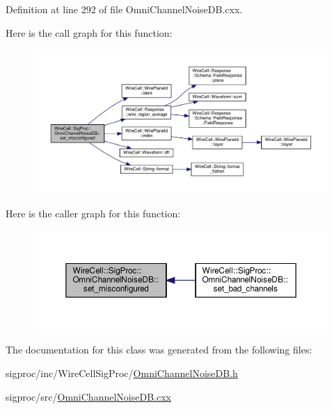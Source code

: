 Definition at line 292 of file Omni\+Channel\+Noise\+D\+B.\+cxx.

Here is the call graph for this function\+:
\nopagebreak
\begin{figure}[H]
\begin{center}
\leavevmode
\includegraphics[width=350pt]{class_wire_cell_1_1_sig_proc_1_1_omni_channel_noise_d_b_a7a1a60aef8d2935c36e27a735117a1cb_cgraph}
\end{center}
\end{figure}
Here is the caller graph for this function\+:
\nopagebreak
\begin{figure}[H]
\begin{center}
\leavevmode
\includegraphics[width=350pt]{class_wire_cell_1_1_sig_proc_1_1_omni_channel_noise_d_b_a7a1a60aef8d2935c36e27a735117a1cb_icgraph}
\end{center}
\end{figure}


The documentation for this class was generated from the following files\+:\begin{DoxyCompactItemize}
\item 
sigproc/inc/\+Wire\+Cell\+Sig\+Proc/\hyperlink{_omni_channel_noise_d_b_8h}{Omni\+Channel\+Noise\+D\+B.\+h}\item 
sigproc/src/\hyperlink{_omni_channel_noise_d_b_8cxx}{Omni\+Channel\+Noise\+D\+B.\+cxx}\end{DoxyCompactItemize}

